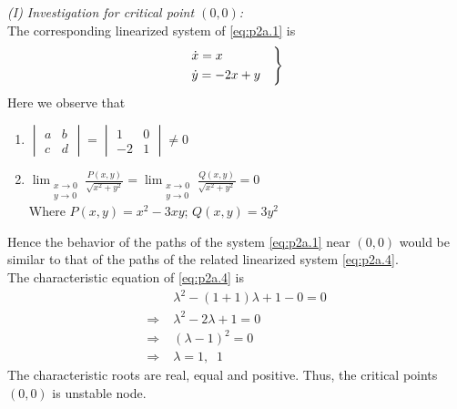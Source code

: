 \documentclass[../main-sheet.tex]{subfiles}
\begin{document}
\begin{soln}[a]
    \emph{(I) Investigation for critical point \((0,0)\):}\\
    The corresponding linearized system of \eqref{eq:p2a.1} is 
    \begin{equation}
        \begin{rcases}
            \dot{x}=x\\
            \dot{y}=-2x+y\quad
        \end{rcases}
        \label{eq:p2a.4}
    \end{equation}
    Here we observe that
    \begin{enumerate}[label=(\roman*)]
        \item \(\begin{vmatrix}
            a&b\\
            c&d
        \end{vmatrix}=\begin{vmatrix}
            1&0\\
            -2&1
        \end{vmatrix}\neq 0\)
        \item \(\displaystyle\lim_{\substack{x\to 0 \\ y\to 0}} \frac{P(x,y)}{\sqrt{x^2+y^2}}=\lim_{\substack{x\to 0 \\ y\to 0}} \frac{Q(x,y)}{\sqrt{x^2+y^2}}=0\)\\ 
        
        Where \(P(x,y)=x^2-3xy\); \(Q(x,y)=3y^2\)
    \end{enumerate}
    Hence the behavior of the paths of the system \eqref{eq:p2a.1} near \((0,0)\) would be similar to that of the paths of the related linearized system \eqref{eq:p2a.4}.\\
    The characteristic equation of \eqref{eq:p2a.4} is
    \begin{align*}
        &\lambda^2-(1+1)\lambda+1-0=0\\
        \Rightarrow\;&\lambda^2-2\lambda+1=0\\
        \Rightarrow\;&(\lambda-1)^2=0\\
        \Rightarrow\;&\lambda=1,\;\;1
    \end{align*}
    The characteristic roots are real, equal and positive. Thus, the critical points \((0,0)\) is unstable node.\\
    

\end{soln}
\end{document}
